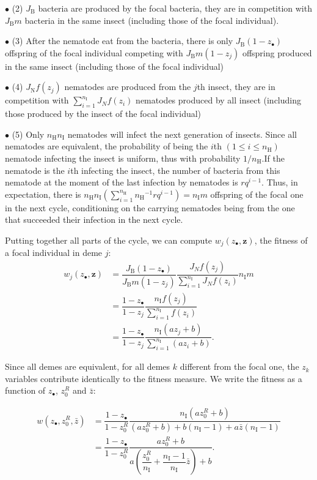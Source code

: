 \documentclass{article}
\newcommand{\nN}{{n_\textrm{H}}}
\newcommand{\nI}{{n_\textrm{I}}}
\begin{document}
 
 $\bullet$ (2) $J_{\mathrm{B}}$ bacteria are produced by the focal bacteria, they are in competition with $J_{\mathrm{B}} m$ bacteria in the same insect (including those of the focal individual).
 
 
 $\bullet$ (3) After the nematode eat from the bacteria, there is only $J_{\mathrm{B}}(1-z_\bullet)$ offspring of the focal individual competing with $J_{\mathrm{B}} m (1-z_j)$ offspring produced in the same insect (including those of the focal individual)
 
 
 $\bullet$ (4) $J_{\mathrm{N}} f(z_j)$ nematodes are produced from the $j$th insect, they are in competition with $\sum_{i=1}^{\nI} J_N f(z_i)$ nematodes produced by all insect (including those produced by the insect of the focal individual)
 
 
 $\bullet$ (5) Only $\nN \nI$ nematodes will infect the next generation of insects. Since all nematodes are equivalent, the probability of being the $i$th $(1 \leq i \leq \nN)$ nematode infecting the insect 
is uniform, thus with probability $1/\nN$.If the nematode is the $i$th infecting the insect, the number of bacteria from this nematode at the moment of the last infection by nematodes is $r q^{i-1}$.
Thus, in expectation, there is $\nN \nI (\sum_{i=1}^\nN \nN^{-1}  r q^{i-1})=\nI m$ offspring of the focal one in the next cycle, conditioning on the carrying nematodes being from the one that succeeded their infection in the next cycle. 


Putting together all parts of the cycle, we can compute $ w_j(z_\bullet , \mathbf{z} )$, the fitness of a focal individual in deme $j$:
 \begin{align}
 w_j(z_\bullet , \mathbf{z} ) &= \dfrac{J_{\mathrm{B}}(1-z_\bullet)}{J_{\mathrm{B}} m (1- z_j)}\dfrac{ J_N f(z_j)}{\sum_{i=1}^{\nI} J_N  f(z_i)} \nI m \\
 &= \dfrac{1-z_\bullet}{1- z_j}\dfrac{\nI f(z_j)}{\sum_{i=1}^{\nI} f(z_i)} \\
  &= \dfrac{1-z_\bullet}{1- z_j}\dfrac{\nI (a z_j +b) }{\sum_{i=1}^{\nI} (a z_i +b)}.
 \end{align}
 
 Since all demes are equivalent, for all demes $k$ different from the focal one, the $z_k$ variables contribute identically to the fitness measure. We write the fitness as a function of $z_\bullet$, $z_0^R$ and $\bar{z}$:
 
  \begin{align}
 w(z_\bullet ,z_0^R , \bar{z} ) &= \dfrac{1-z_\bullet}{1- z_0^R}\dfrac{\nI (a z_0^R +b) }{(a z_0^R +b)+ b(\nI -1) +a \bar{z} (\nI-1)} \\
 &= \dfrac{1-z_\bullet}{1- z_0^R}\dfrac{ a z_0^R +b }{a \left( \dfrac{z_0^R}{\nI} +\dfrac{\nI-1}{\nI} \bar{z} \right) +b}.
  \end{align}
  
\end{document}
